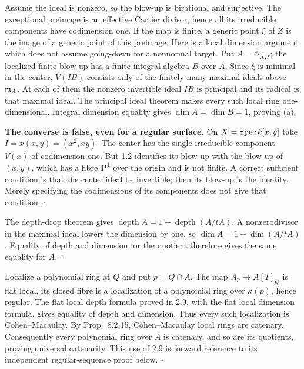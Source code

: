 \documentclass[11pt]{article}
\let\chapterexercise\exercise
\renewcommand{\exercise}[2]{\Needspace{8\baselineskip}\chapterexercise{#1}{#2}}
\begin{document}
\pf
Assume the ideal is nonzero, so the blow-up is birational and surjective. The exceptional preimage is an effective Cartier divisor, hence all its irreducible components have codimension one. If the map is finite, a generic point $\xi$ of $Z$ is the image of a generic point of this preimage. Here is a local dimension argument which does not assume going-down for a nonnormal target. Put $A=\mathcal O_{X,\xi}$; the localized finite blow-up has a finite integral algebra $B$ over $A$. Since $\xi$ is minimal in the center, $V(IB)$ consists only of the finitely many maximal ideals above $\mathfrak m_A$. At each of them the nonzero invertible ideal $IB$ is principal and its radical is that maximal ideal. The principal ideal theorem makes every such local ring one-dimensional. Integral dimension equality gives $\dim A=\dim B=1$, proving (a).

\textbf{The converse is false, even for a regular surface.} On $X=\operatorname{Spec} k[x,y]$ take $I=x(x,y)=(x^2,xy)$. The center has the single irreducible component $V(x)$ of codimension one. But 1.2 identifies its blow-up with the blow-up of $(x,y)$, which has a fibre $\mathbf P^1$ over the origin and is not finite. A correct sufficient condition is that the center ideal be invertible; then its blow-up is the identity. Merely specifying the codimensions of its components does not give that condition. \hfill$\square$

\pf
The depth-drop theorem gives $\operatorname{depth}A=1+\operatorname{depth}(A/tA)$. A nonzerodivisor in the maximal ideal lowers the dimension by one, so $\dim A=1+\dim(A/tA)$. Equality of depth and dimension for the quotient therefore gives the same equality for $A$. \hfill$\square$

\pf
Localize a polynomial ring at $Q$ and put $p=Q\cap A$. The map $A_p\to A[T]_Q$ is flat local, its closed fibre is a localization of a polynomial ring over $\kappa(p)$, hence regular. The flat local depth formula proved in 2.9, with the flat local dimension formula, gives equality of depth and dimension. Thus every such localization is Cohen--Macaulay. By Prop.~8.2.15, Cohen--Macaulay local rings are catenary. Consequently every polynomial ring over $A$ is catenary, and so are its quotients, proving universal catenarity. This use of 2.9 is forward reference to its independent regular-sequence proof below. \hfill$\square$
\end{document}
